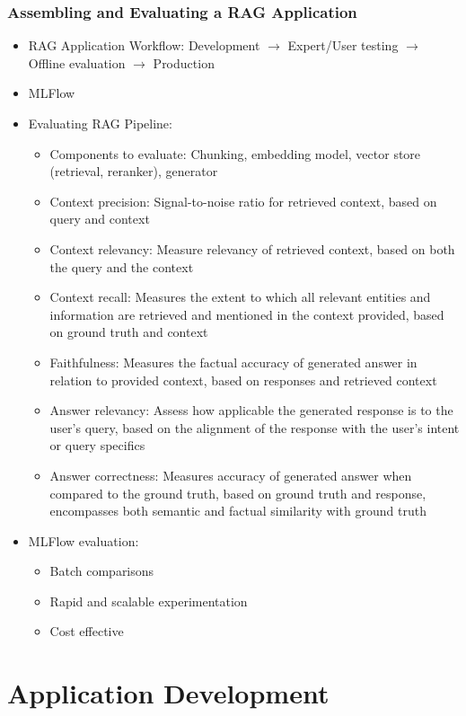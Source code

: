 \documentclass[11pt]{scrartcl}
\begin{document}
\subsubsection*{Assembling and Evaluating a RAG Application}
\begin{itemize}
	\item RAG Application Workflow: Development $\to$ Expert/User testing $\to$ Offline evaluation $\to$ Production
	\item MLFlow
	\item Evaluating RAG Pipeline:
	\begin{itemize}
		\item Components to evaluate: Chunking, embedding model, vector store (retrieval, reranker), generator
		\item Context precision: Signal-to-noise ratio for retrieved context, based on query and context
		\item Context relevancy: Measure relevancy of retrieved context, based on both the query and the context
		\item Context recall: Measures the extent to which all relevant entities and information are retrieved and mentioned in the context provided, based on ground truth and context
		\item Faithfulness: Measures the factual accuracy of generated answer in relation to provided context, based on responses and retrieved context
		\item Answer relevancy: Assess how applicable the generated response is to the user's query, based on the alignment of the response with the user's intent or query specifics
		\item Answer correctness: Measures accuracy of generated answer when compared to the ground truth, based on ground truth and response, encompasses both semantic and factual similarity with ground truth
	\end{itemize}
	\item MLFlow evaluation:
	\begin{itemize}
		\item Batch comparisons
		\item Rapid and scalable experimentation
		\item Cost effective
	\end{itemize}
\end{itemize}



\newpage
\section{Application Development}
\end{document}
